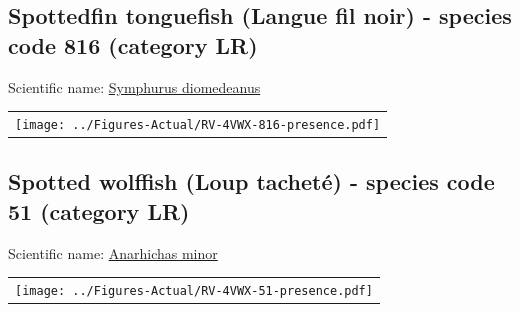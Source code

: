\documentclass[12pt]{article}\usepackage[]{graphicx}\usepackage[]{color}
\begin{document}
\setcounter{figure}{0}

\hypertarget{sec:816}{%
\subsection{Spottedfin tonguefish (Langue fil noir) - species code 816 (category LR)}\label{sec:816}}

  


Scientific name: \href{http://www.marinespecies.org/aphia.php?p=taxdetails\&id=159358}{Symphurus diomedeanus} \newline
\begin{minipage}{1.0\textwidth}
 \begin{tabular}{c}
\texttt{[image: ../Figures-Actual/RV-4VWX-816-presence.pdf]} \\ 
\end{tabular} 
\end{minipage}
\clearpage

\renewcommand\thefigure{\thesubsection\Alph{figure}}

\setcounter{figure}{0}

\hypertarget{sec:51}{%
\subsection{Spotted wolffish (Loup tacheté) - species code 51 (category LR)}\label{sec:51}}

  


Scientific name: \href{http://www.marinespecies.org/aphia.php?p=taxdetails\&id=126759}{Anarhichas minor} \newline
\begin{minipage}{1.0\textwidth}
 \begin{tabular}{c}
\texttt{[image: ../Figures-Actual/RV-4VWX-51-presence.pdf]} \\ 
\end{tabular} 
\end{minipage}
\clearpage

\renewcommand\thefigure{\thesubsection\Alph{figure}}

\setcounter{figure}{0}
\end{document}
